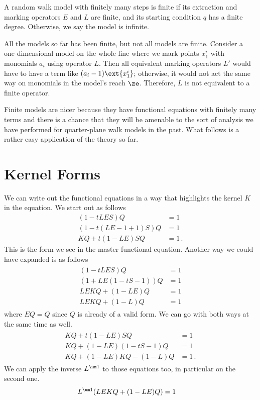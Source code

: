 \begin{definition} A random walk model with finitely many steps is finite if its extraction and marking operators $E$ and $L$ are finite, and its starting condition $q$ has a finite degree. Otherwise, we say the model is infinite.
\end{definition}
\begin{example} All the models so far has been finite, but not all models are finite. Consider a one-dimensional model on the whole line where we mark points $x_1^i$ with monomials $a_i$ using operator $L$. Then all equivalent marking operators $L'$ would have to have a term like $(a_i-1)\ext{x_1^i}$; otherwise, it would not act the same way on monomials in the model's reach $\ze$. Therefore, $L$ is not equivalent to a finite operator.
\end{example}
Finite models are nicer because they have functional equations with finitely many terms and there is a chance that they will be amenable to the sort of analysis we have performed for quarter-plane walk models in the past. What follows is a rather easy application of the theory so far.

\section{Kernel Forms}
We can write out the functional equations in a way that highlights the kernel $K$ in the equation. We start out as follows
\begin{align}
	(1-tLES)Q &= 1\\
	(1-t(LE-1+1)S)Q &=1\\
	KQ + t(1-LE)SQ &= 1\,.
\end{align}
This is the form we see in the master functional equation. Another way we could have expanded is as follows
\begin{align}
\begin{split}
	(1-tLES)Q &= 1\\
	(1+LE(1-tS-1))Q &= 1\\
	LEKQ+(1-LE)Q &= 1\\
	LEKQ+(1-L)Q &= 1
\end{split}	
\end{align}
where $EQ = Q$ since $Q$ is already of a valid form. We can go with both ways at the same time as well.
\begin{align}\begin{split}
	KQ + t(1-LE)SQ &= 1\\
	KQ + (1-LE)(1-tS-1)Q &=1\\
	KQ + (1-LE)KQ - (1-L)Q &= 1\,.
\end{split}\end{align}
We can apply the inverse $L^{\um 1}$ to those equations too, in particular on the second one.
\begin{align}
\begin{split}
	L^{\um 1}(LEKQ+(1-LE)Q) &= 1
\end{split}	
\end{align}

